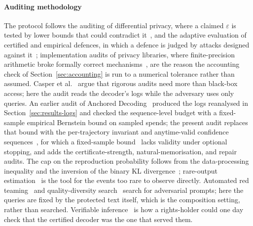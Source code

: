 \paragraph{Auditing methodology}
The protocol follows the auditing of differential privacy, where a claimed $\varepsilon$ is tested by lower bounds that could contradict it~\cite{jagielski2020auditing,nasr2023tight,steinke2023privacy,annamalai2024nearly,zanellabeguelin2023bayesian,pillutla2023unleashing,kong2023dpauditorium}, and the adaptive evaluation of certified and empirical defences, in which a defence is judged by attacks designed against it~\cite{athalye2018obfuscated,carlini2019evaluating,tramer2020adaptive}; implementation audits of privacy libraries, where finite-precision arithmetic broke formally correct mechanisms~\cite{mironov2012significance,casacuberta2022widespread}, are the reason the accounting check of Section~\ref{sec:accounting} is run to a numerical tolerance rather than assumed. Casper et al.~\cite{casper2024blackbox} argue that rigorous audits need more than black-box access; here the audit reads the decoder's logs while the adversary uses only queries. An earlier audit of Anchored Decoding~\cite{vijayavallabh2026audit} produced the logs reanalysed in Section~\ref{sec:results-logs} and checked the sequence-level budget with a fixed-sample empirical Bernstein bound on sampled spends; the present audit replaces that bound with the per-trajectory invariant and anytime-valid confidence sequences~\cite{howard2021timeuniform,waudbysmith2024estimating,chugg2025closedform,chugg2023auditing,zhou2026adaptive}, for which a fixed-sample bound~\cite{maurer2009empirical,mnih2008empirical} lacks validity under optional stopping, and adds the certificate-strength, natural-memorisation, and repair audits. The cap on the reproduction probability follows from the data-processing inequality and the inversion of the binary KL divergence~\cite{polyanskiy2024information,tsybakov2009introduction,bretagnolle1979estimation}; rare-output estimation~\cite{wu2025rare} is the tool for the events too rare to observe directly. Automated red teaming~\cite{perez2022redteaming,ganguli2022redteaming} and quality-diversity search~\cite{mouret2015mapelites,samvelyan2024rainbow} search for adversarial prompts; here the queries are fixed by the protected text itself, which is the composition setting, rather than searched. Verifiable inference~\cite{sun2024zkllm} is how a rights-holder could one day check that the certified decoder was the one that served them.
